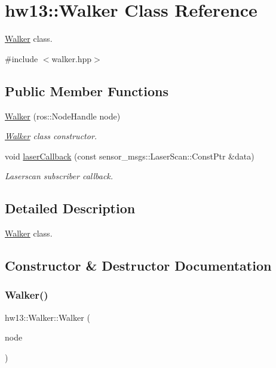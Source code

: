 \hypertarget{classhw13_1_1_walker}{}\section{hw13\+:\+:Walker Class Reference}
\label{classhw13_1_1_walker}


\hyperlink{classhw13_1_1_walker}{Walker} class.  




{\ttfamily \#include $<$walker.\+hpp$>$}

\subsection*{Public Member Functions}
\begin{DoxyCompactItemize}
\item 
\hyperlink{classhw13_1_1_walker_a719ac99378e3ddf07b4811058018208d}{Walker} (ros\+::\+Node\+Handle node)
\begin{DoxyCompactList}\small\item\em \hyperlink{classhw13_1_1_walker}{Walker} class constructor. \end{DoxyCompactList}\item 
void \hyperlink{classhw13_1_1_walker_a5675ccfb58c0e78adfad582d840e8f42}{laser\+Callback} (const sensor\+\_\+msgs\+::\+Laser\+Scan\+::\+Const\+Ptr \&data)
\begin{DoxyCompactList}\small\item\em Laserscan subscriber callback. \end{DoxyCompactList}\end{DoxyCompactItemize}


\subsection{Detailed Description}
\hyperlink{classhw13_1_1_walker}{Walker} class. 

\subsection{Constructor \& Destructor Documentation}
\mbox{\label{classhw13_1_1_walker_a719ac99378e3ddf07b4811058018208d}} 
\subsubsection{\texorpdfstring{Walker()}{Walker()}}
{\footnotesize\ttfamily hw13\+::\+Walker\+::\+Walker (\begin{DoxyParamCaption}\item[{ros\+::\+Node\+Handle}]{node }\end{DoxyParamCaption})\hspace{0.3cm}{\ttfamily [explicit]}}



